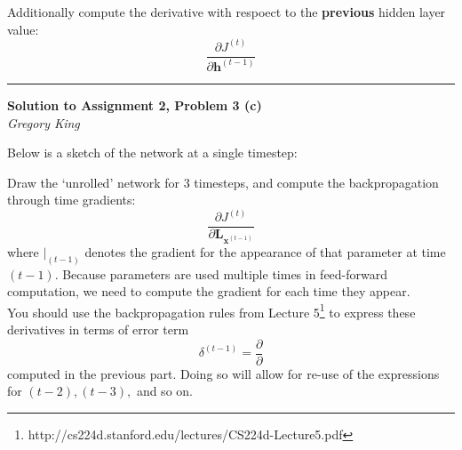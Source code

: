 \documentclass[letter,12pt]{article}
\newcommand{\myhwtitle}[3]
{\begin{center}
{\large {\bf Solution to Assignment {#1}, Problem {#2}}}\\
\medskip
{\it {#3}} %
\end{center}}
\newcommand{\solutionsAuthor}{Gregory King}
\begin{document}
\noindent Additionally compute the derivative with respoect to the \textbf{previous} hidden layer value:
\begin{equation}
\frac{\partial{J^(t)}}{\partial{\boldsymbol h}^{(t-1)}}
\end{equation}
\vspace{5mm}
\noindent\rule{\textwidth}{0.4pt}

\clearpage

\myhwtitle{2}{3 (c)}{\solutionsAuthor}

\bigskip

\noindent Below is a sketch of the network at a single timestep:
\begin{center}
\end{center}

\noindent Draw the `unrolled' network for 3 timesteps, and compute the backpropagation through time gradients:
\begin{equation}
\frac{\partial{J^(t)}}{\partial{\boldsymbol L}_{{\boldsymbol x}^{(t-1)}}}
\end{equation}
\noindent where $\big\rvert_{(t-1)}$ denotes the gradient for the appearance of that parameter at time $(t-1)$. Because parameters are used multiple times in feed-forward computation, we need to compute the gradient for each time they appear.\\

\noindent You should use the backpropagation rules from Lecture 5\footnote{http://cs224d.stanford.edu/lectures/CS224d-Lecture5.pdf} to express these derivatives in terms of error term
\begin{equation}
\delta^{(t-1)} = \frac{\partial}{\partial}
\end{equation}
computed in the previous part. Doing so will allow for re-use of the expressions for $(t-2), (t-3),$ and so on.\\
\end{document}

